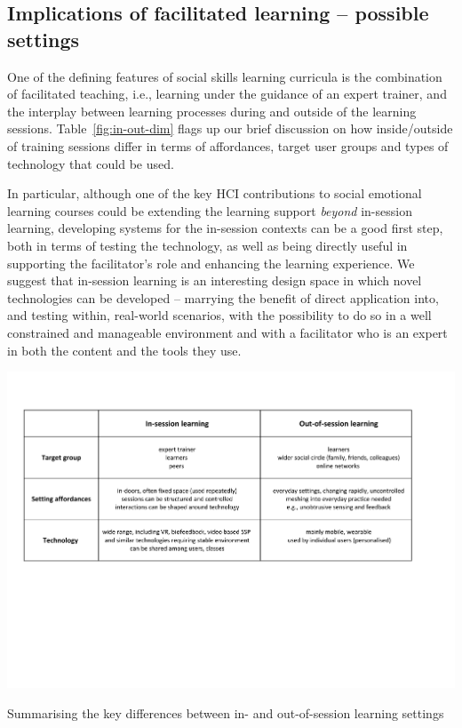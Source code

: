 \documentclass[prodmode,acmtochi]{acmsmall}
\begin{document}
\subsection{Implications of facilitated learning -- possible settings}
\label{sec:facilitated}

One of the defining features of social skills learning curricula is the combination of facilitated teaching, i.e., learning under the guidance of an expert trainer, and the interplay between learning processes during and outside of the learning sessions. 
Table~\ref{fig:in-out-dim} flags up our brief discussion on how inside/outside of training sessions differ in terms of affordances, target user groups and types of technology that could be used. 

In particular, although one of the key HCI contributions to social emotional learning courses could be extending the learning support \emph{beyond} in-session learning, developing systems for the in-session contexts can be a good first step, both in terms of testing the technology, as well as being directly useful in supporting the facilitator's role and enhancing the learning experience. We suggest that in-session learning is an interesting design space in which novel technologies can be developed -- marrying the benefit of direct application into, and testing within, real-world scenarios, with the possibility to do so in a well constrained and manageable environment and with a facilitator who is an expert in both the content and the tools they use.   




\begin{table}
  \centering
        \includegraphics[width=\textwidth]{images/in-out.pdf}
        \caption{Summarising the key differences between in- and out-of-session learning settings}
        \label{fig:in-out-dim}
\end{table}
\end{document}
